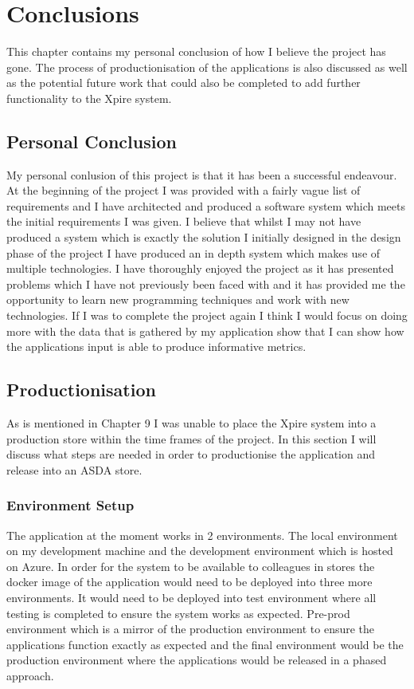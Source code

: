 \documentclass[a4paper,11pt]{report}
\begin{document}
\chapter{Conclusions}
This chapter contains my personal conclusion of how I believe the project has gone. The process of productionisation of the applications is also discussed as well as the potential future work that could also be completed to add further functionality to the Xpire system. 
\section{Personal Conclusion}
My personal conlusion of this project is that it has been a successful endeavour. At the beginning of the project I was provided with a fairly vague list of requirements and I have architected and produced a software system which meets the initial requirements I was given. I believe that whilst I may not have produced a system which is exactly the solution I initially designed in the design phase of the project I have produced an in depth system which makes use of multiple technologies. 
I have thoroughly enjoyed the project as it has presented problems which I have not previously been faced with and it has provided me the opportunity to learn new programming techniques and work with new technologies. If I was to complete the project again I think I would focus on doing more with the data that is gathered by my application show that I can show how the applications input is able to produce informative metrics. 
\section{Productionisation}
As is mentioned in Chapter 9 I was unable to place the Xpire system into a production store within the time frames of the project. In this section I will discuss what steps are needed in order to productionise the application and release into an ASDA store. 
\subsection{Environment Setup}
The application at the moment works in 2 environments. The local environment on my development machine and the development environment which is hosted on Azure. In order for the system to be available to colleagues in stores the docker image of the application would need to be deployed into three more environments. It would need to be deployed into test environment where all testing is completed to ensure the system works as expected. Pre-prod environment which is a mirror of the production environment to ensure the applications function exactly as expected and the final environment would be the production environment where the applications would be released in a phased approach. 
\end{document}
